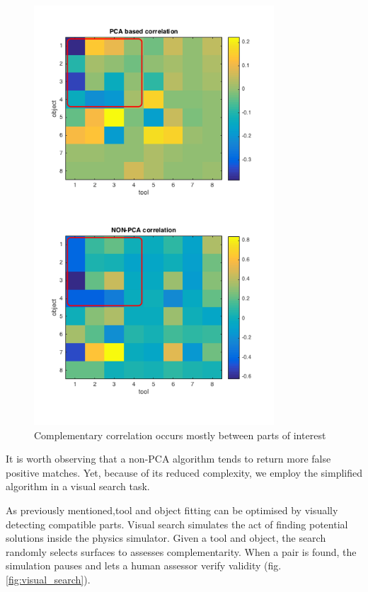 \documentclass[
    floatsintext
]{article}
\begin{document}
\begin{figure}[h]
  \centering
  \includegraphics[width=0.8\textwidth]{./figures/correlation_comparison.png}
  \caption{Complementary correlation occurs mostly between parts of interest}
  \label{fig:correlation_parts}
\end{figure}  

It is worth observing that a non-PCA algorithm tends to return more false positive matches. 
Yet, because of its reduced complexity, we employ the simplified algorithm in a visual search task.

As previously mentioned,tool and object fitting can be optimised by visually detecting compatible parts.  
Visual search simulates the act of finding potential solutions inside the physics simulator.
Given a tool and object, the search randomly selects surfaces to assesses complementarity.
When a pair is found, the simulation pauses and lets a human assessor verify validity (fig. \ref{fig:visual_search}). 
\end{document}
